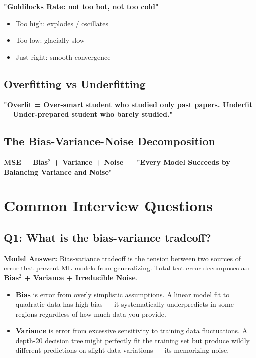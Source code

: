 \documentclass[11pt]{article}
\providecommand{\tightlist}{\setlength{\itemsep}{1pt}\setlength{\parskip}{0pt}}
\begin{document}
\textbf{"Goldilocks Rate: not too hot, not too cold"}

\begin{itemize}
\tightlist
\item
  Too high: explodes / oscillates
\item
  Too low: glacially slow
\item
  Just right: smooth convergence
\end{itemize}

\subsection{Overfitting vs Underfitting}\label{overfitting-vs-underfitting-1}

\textbf{"Overfit = Over-smart student who studied only past papers. Underfit = Under-prepared student who barely studied."}

\subsection{The Bias-Variance-Noise Decomposition}\label{the-bias-variance-noise-decomposition}

\textbf{MSE = Bias\(^2\) + Variance + Noise --- "Every Model Succeeds by Balancing Variance and Noise"}

\section{Common Interview Questions}\label{common-interview-questions}

\subsection{Q1: What is the bias-variance tradeoff?}\label{q1-what-is-the-bias-variance-tradeoff}

\textbf{Model Answer:}
Bias-variance tradeoff is the tension between two sources of error that prevent ML models from generalizing. Total test error decomposes as: \textbf{Bias\(^2\) + Variance + Irreducible Noise}.

\begin{itemize}
\tightlist
\item
  \textbf{Bias} is error from overly simplistic assumptions. A linear model fit to quadratic data has high bias --- it systematically underpredicts in some regions regardless of how much data you provide.
\item
  \textbf{Variance} is error from excessive sensitivity to training data fluctuations. A depth-20 decision tree might perfectly fit the training set but produce wildly different predictions on slight data variations --- it\textquotesingle s memorizing noise.
\end{itemize}
\end{document}
